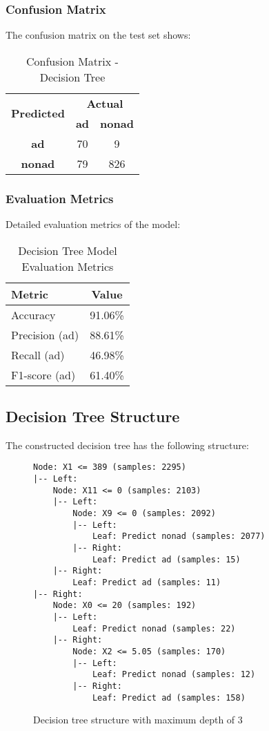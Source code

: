 \subsubsection{Confusion Matrix}

The confusion matrix on the test set shows:

\begin{table}[h]
\centering
\caption{Confusion Matrix - Decision Tree}
\begin{tabular}{|c|c|c|}
\hline
\multirow{2}{*}{\textbf{Predicted}} & \multicolumn{2}{c|}{\textbf{Actual}} \\
\cline{2-3}
 & \textbf{ad} & \textbf{nonad} \\
\hline
\textbf{ad} & 70 & 9 \\
\hline
\textbf{nonad} & 79 & 826 \\
\hline
\end{tabular}
\end{table}

\subsubsection{Evaluation Metrics}

Detailed evaluation metrics of the model:

\begin{table}[h]
\centering
\caption{Decision Tree Model Evaluation Metrics}
\begin{tabular}{|l|c|}
\hline
\textbf{Metric} & \textbf{Value} \\
\hline
Accuracy & 91.06\% \\
Precision (ad) & 88.61\% \\
Recall (ad) & 46.98\% \\
F1-score (ad) & 61.40\% \\
\hline
\end{tabular}
\end{table}

\subsection{Decision Tree Structure}

The constructed decision tree has the following structure:

\begin{figure}[h]
\centering
\begin{verbatim}
Node: X1 <= 389 (samples: 2295)
|-- Left:
    Node: X11 <= 0 (samples: 2103)
    |-- Left:
        Node: X9 <= 0 (samples: 2092)
        |-- Left:
            Leaf: Predict nonad (samples: 2077)
        |-- Right:
            Leaf: Predict ad (samples: 15)
    |-- Right:
        Leaf: Predict ad (samples: 11)
|-- Right:
    Node: X0 <= 20 (samples: 192)
    |-- Left:
        Leaf: Predict nonad (samples: 22)
    |-- Right:
        Node: X2 <= 5.05 (samples: 170)
        |-- Left:
            Leaf: Predict nonad (samples: 12)
        |-- Right:
            Leaf: Predict ad (samples: 158)
\end{verbatim}
\caption{Decision tree structure with maximum depth of 3}
\end{figure}

